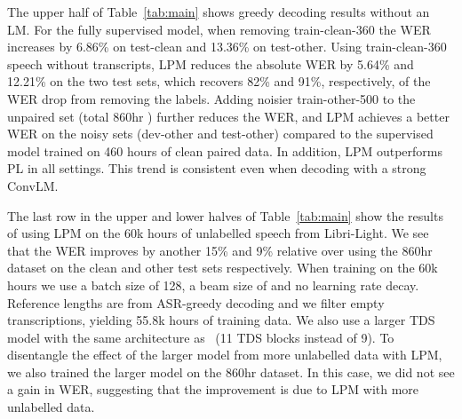 The upper half of Table~\ref{tab:main} shows greedy decoding results without an LM. 
For the fully supervised model, when removing train-clean-360 the WER increases by 6.86\% on test-clean and 13.36\% on test-other.
Using train-clean-360 speech without transcripts, LPM reduces the absolute WER by 5.64\% and 12.21\% on the two test sets, which recovers 82\% and 91\%, respectively, of the WER drop from removing the labels.
Adding noisier train-other-500 to the unpaired set (total 860hr ) further reduces the WER, and LPM achieves a better WER on the noisy sets (dev-other and test-other) compared to the supervised model trained on 460 hours of clean paired data.
In addition, LPM outperforms PL in all settings.
This trend is consistent even when decoding with a strong ConvLM.

The last row in the upper and lower halves of Table~\ref{tab:main} show the results of using LPM on the 60k hours of unlabelled speech from Libri-Light. We see that the WER improves by another 15\% and 9\% relative over using the 860hr dataset on the clean and other test sets respectively. When training on the 60k hours we use a batch size of 128, a beam size of  and no learning rate decay. Reference lengths are from ASR-greedy decoding and we filter empty transcriptions, yielding 55.8k hours of training data. We also use a larger TDS model with the same architecture as~\citet{hannun2019sequence} (11 TDS blocks instead of 9). To disentangle the effect of the larger model from more unlabelled data with LPM, we also trained the larger model on the 860hr dataset. In this case, we did not see a gain in WER, suggesting that the improvement is due to LPM with more unlabelled data.

